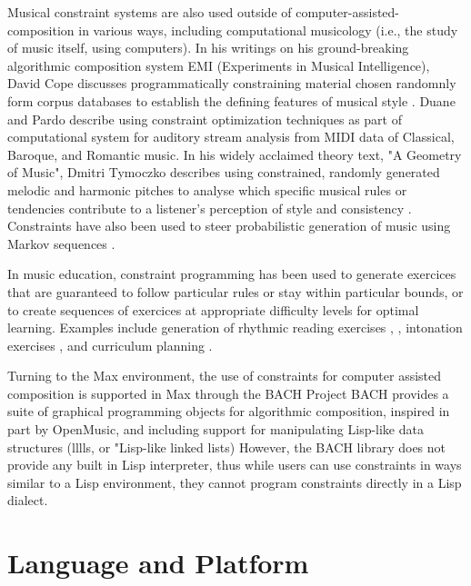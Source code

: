 \documentclass[pmlr]{jmlr}%
\begin{document}
Musical constraint systems are also used outside of computer-assisted-composition in various
ways, including computational musicology (i.e., the study of music itself, using computers).
In his writings on his ground-breaking algorithmic composition system EMI 
(Experiments in Musical Intelligence), David Cope discusses programmatically constraining 
material chosen randomnly form corpus databases
to establish the defining features of musical style \citep{cope1989experiments}. 
Duane and Pardo \citep{duane2009streaming} describe using constraint optimization techniques as part 
of computational system for auditory stream analysis from MIDI data of Classical, Baroque,
and Romantic music. 
In his widely acclaimed theory text, "A Geometry of Music", Dmitri Tymoczko describes using 
constrained, randomly generated melodic and harmonic pitches
to analyse which specific musical rules or tendencies contribute to a listener's perception 
of style and consistency \citep{tymoczko2011geometry}. Constraints have also been used to steer probabilistic generation of music using Markov sequences \citep{pachet2011markov}. 

In music education, constraint programming has been used to generate exercices
that are guaranteed to follow particular rules or stay within particular bounds, or to
create sequences of exercices at appropriate difficulty levels for optimal learning.
Examples include generation of rhythmic reading exercises \citep{percival2008generating},
\citep{kuuskankare2013rhythm}, intonation exercises \citep{percival2008computer}, and
curriculum planning \citep{holland2013artificial}. 

Turning to the Max environment, the use of constraints for computer assisted composition 
is supported in Max through the BACH Project
BACH provides a suite of graphical programming objects for algorithmic composition,
inspired in part by OpenMusic, and including support for manipulating Lisp-like data structures 
(lllls, or "Lisp-like linked lists) \citep{agostini2012bach}
However, the BACH library does not provide any built in Lisp interpreter, thus while users can 
use constraints in ways similar to a Lisp environment, they cannot program constraints directly
in a Lisp dialect. 


\section{Language and Platform}
\end{document}
